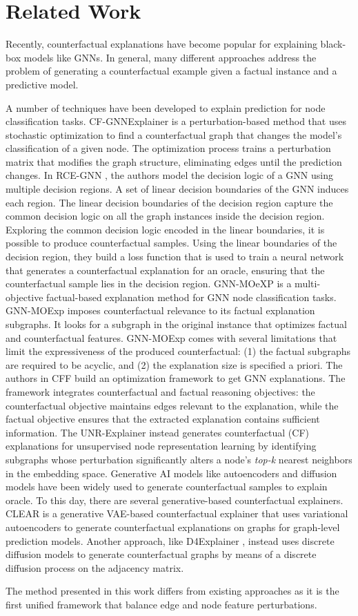 \section{Related Work}
\label{sec:related}
Recently, counterfactual explanations have become popular for explaining black-box models like GNNs. In general, many different approaches address the problem of generating a counterfactual example given a factual instance and a predictive model.

A number of techniques have been developed to explain prediction for node classification tasks. CF-GNNExplainer \cite{lucic2022cf} is a perturbation-based method that uses stochastic optimization to find a counterfactual graph that changes the model's classification of a given node. The optimization process trains a perturbation matrix that modifies the graph structure, eliminating edges until the prediction changes. 
In RCE-GNN \cite{bajaj2021robust}, the authors model the decision logic of a GNN using multiple decision regions. A set of linear decision boundaries of the GNN induces each region. The linear decision boundaries of the decision region capture the common decision logic on all the graph instances inside the decision region. Exploring the common decision logic encoded in the linear boundaries, it is possible to produce counterfactual samples. Using the linear boundaries of the decision region, they build a loss function that is used to train a neural network that generates a counterfactual explanation for an oracle, ensuring that the counterfactual sample lies in the decision region.
GNN-MOeXP \cite{liu2021multi} is a multi-objective factual-based explanation method for GNN node classification tasks. GNN-MOExp imposes counterfactual relevance to its factual explanation subgraphs. It looks for a subgraph in the original instance that optimizes factual and counterfactual features. GNN-MOExp comes with several limitations that limit the expressiveness of the produced counterfactual: (1) the factual subgraphs are required to be acyclic, and (2) the explanation size is specified a priori.
The authors in CFF \cite{tan2022learning} build an optimization framework to get GNN explanations. The framework integrates counterfactual and factual reasoning objectives: the counterfactual objective maintains edges relevant to the explanation, while the factual objective ensures that the extracted explanation contains sufficient information. 
The UNR-Explainer \cite{kangunr}  instead generates counterfactual (CF) explanations for unsupervised node representation learning by identifying subgraphs whose perturbation significantly alters a node’s \textit{top-k} nearest neighbors in the embedding space.
Generative AI models like autoencoders and diffusion models have been widely used to generate counterfactual samples to explain oracle. To this day, there are several generative-based counterfactual explainers. CLEAR \cite{ma2022clear} is a generative VAE-based counterfactual explainer that uses variational autoencoders to generate counterfactual explanations on graphs for graph-level prediction models. Another approach, like D4Explainer \cite{chen2023d4explainer}, instead uses discrete diffusion models to generate counterfactual graphs by means of a discrete diffusion process on the adjacency matrix.

The method presented in this work differs from existing approaches as it is the first unified framework that 
balance edge and node feature perturbations.
\vspace{-1mm}